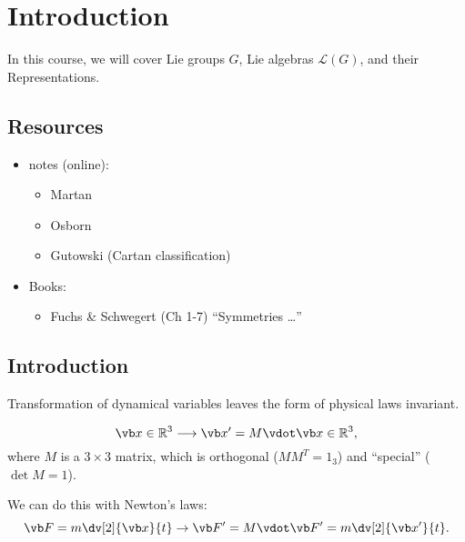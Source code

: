 \chapter{Introduction}%
\label{cha:introduction}

In this course, we will cover Lie groups $G$, Lie algebras $\mathcal{L}(G)$, and their Representations.

\section*{Resources}%
\label{sec:resources}

\begin{itemize}
  \item notes (online):
    \begin{itemize}
      \item Martan
      \item Osborn
      \item Gutowski (Cartan classification)
    \end{itemize}
  \item Books:
    \begin{itemize}
      \item Fuchs \& Schwegert (Ch 1-7) ``Symmetries \dots''
    \end{itemize}
\end{itemize}

\section{Introduction}%
\label{sec:introduction}

\begin{definition}[Symmetry]
Transformation of dynamical variables leaves the form of physical laws invariant.
\end{definition}

\begin{example}[Rotation]
  \begin{equation}
    \vb x \in \mathbb{R}^{3} \longrightarrow \vb x' = M \vdot \vb x \in \mathbb{R}^{3},
  \end{equation}
  where $M$ is a $3\times 3$ matrix, which is orthogonal ($M M^T = 1_{3}$) and ``special'' ($\det M = 1$).

  We can do this with Newton's laws:
  \begin{equation}
    \vb F = m \dv[2]{\vb x}{t} \rightarrow \vb F' = M \vdot \vb F' = m \dv[2]{\vb x'}{t}.
  \end{equation}
\end{example}

